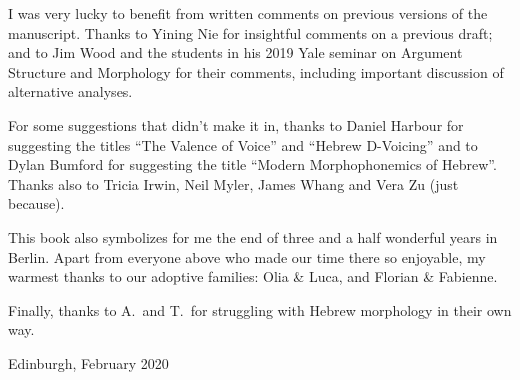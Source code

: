 I was very lucky to benefit from written comments on previous versions of the manuscript. Thanks to Yining Nie for insightful comments on a previous draft; and to Jim Wood and the students in his 2019 Yale seminar on Argument Structure and Morphology for their comments, including important discussion of alternative analyses.

For some suggestions that didn't make it in, thanks to Daniel Harbour for suggesting the titles ``The Valence of Voice'' and ``Hebrew D-Voicing'' and to Dylan Bumford for suggesting the title ``Modern Morphophonemics of Hebrew''. Thanks also to Tricia Irwin, Neil Myler, James Whang and Vera Zu (just because).

This book also symbolizes for me the end of three and a half wonderful years in Berlin. Apart from everyone above who made our time there so enjoyable, my warmest thanks to our adoptive families: Olia \& Luca, and Florian \& Fabienne.

Finally, thanks to A.~and T.~for struggling with Hebrew morphology in their own way.

\bigskip

	\hfill Edinburgh, February 2020
